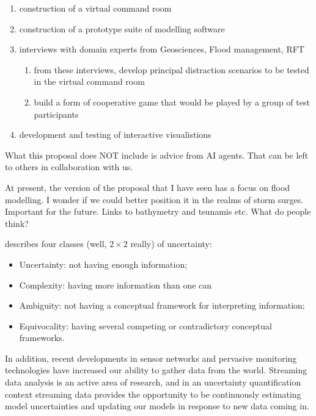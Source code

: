\documentclass[a4paper,fontsize=12pt]{scrartcl}
\begin{document}
\begin{enumerate}
\item construction of a virtual command room
\item construction of a prototype suite of modelling software
\item interviews with domain experts from Geosciences, Flood
  management, RFT
  \begin{enumerate}
  \item from these interviews, develop principal distraction scenarios
    to be tested in the virtual command room
  \item build a form of cooperative game that would be played by a
    group of test participants
  \end{enumerate}
\item development and testing of interactive visualistions
\end{enumerate}

What this proposal does NOT include is advice from AI agents. That can
be left to others in collaboration with us.

At present, the version of the proposal that I have seen has a focus
on flood modelling. I wonder if we could better position it in the
realms of storm surges. Important for the future. Links to bathymetry
and tsunamis etc. What do people think?




\textcite{zack_role_2007} describes four classes (well, $2\times2$ really) of uncertainty:
\begin{itemize}
\item Uncertainty: not having enough information;
\item Complexity: having more information than one can
\item Ambiguity: not having a conceptual framework for interpreting
  information;
\item Equivocality: having several competing or contradictory
  conceptual frameworks.
\end{itemize}

In addition, recent developments in sensor networks and pervasive
monitoring technologies have increased our ability to gather data from
the world. Streaming data analysis is an active area of research, and
in an uncertainty quantification context streaming data provides the
opportunity to be continuously estimating model uncertainties and
updating our models in response to new data coming in.
\end{document}
